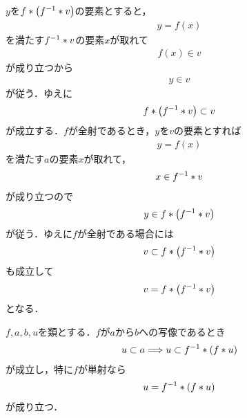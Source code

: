 	\begin{sketch}
		$y$を$f \ast \left({f}^{-1} \ast v\right)$の要素とすると，
		\begin{align}
			y = f(x)
		\end{align}
		を満たす${f}^{-1} \ast v$の要素$x$が取れて
		\begin{align}
			f(x) \in v
		\end{align}
		が成り立つから
		\begin{align}
			y \in v
		\end{align}
		が従う．ゆえに
		\begin{align}
			f \ast \left({f}^{-1} \ast v\right) \subset v
		\end{align}
		が成立する．$f$が全射であるとき，$y$を$v$の要素とすれば
		\begin{align}
			y = f(x)
		\end{align}
		を満たす$a$の要素$x$が取れて，
		\begin{align}
			x \in {f}^{-1} \ast v
		\end{align}
		が成り立つので
		\begin{align}
			y \in f \ast \left({f}^{-1} \ast v\right)
		\end{align}
		が従う．ゆえに$f$が全射である場合には
		\begin{align}
			v \subset f \ast \left({f}^{-1} \ast v\right)
		\end{align}
		も成立して
		\begin{align}
			v = f \ast \left({f}^{-1} \ast v\right)
		\end{align}
		となる．
		\QED
	\end{sketch}
	
	\begin{screen}
		\begin{thm}[単射ならば像の原像で元に戻る]\label{projective_injective_image_preimage_2}
			$f,a,b,u$を類とする．$f$が$a$から$b$への写像であるとき
			\begin{align}
				u \subset a \Longrightarrow u \subset {f}^{-1} \ast \left(f \ast u\right)
			\end{align}
			が成立し，特に$f$が単射なら
			\begin{align}
				u = {f}^{-1} \ast \left(f \ast u\right)
			\end{align}
			が成り立つ．
		\end{thm}
	\end{screen}
	
